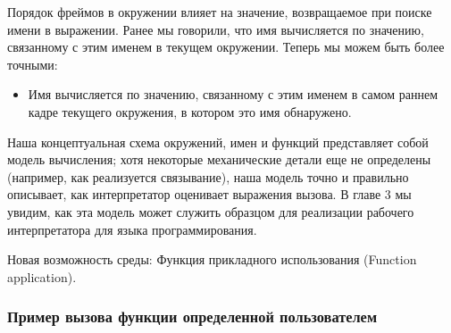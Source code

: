 Порядок фреймов в окружении влияет на значение, возвращаемое при поиске имени в выражении. Ранее мы говорили, что имя вычисляется по значению, связанному с этим именем в текущем окружении. Теперь мы можем быть более точными:
\begin{itemize}
  \item Имя вычисляется по значению, связанному с этим именем в самом раннем кадре текущего окружения, в котором это имя обнаружено.
\end{itemize}

Наша концептуальная схема окружений, имен и функций представляет собой модель вычисления; хотя некоторые механические детали еще не определены (например, как реализуется связывание), наша модель точно и правильно описывает, как интерпретатор оценивает выражения вызова. В главе 3 мы увидим, как эта модель может служить образцом для реализации рабочего интерпретатора для языка программирования.

Новая возможность среды: Функция прикладного использования (Function application).

\subsubsection{Пример вызова функции определенной пользователем}


